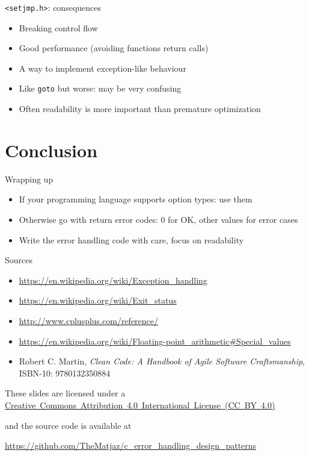 \documentclass[aspectratio=169,14pt]{beamer}
\begin{document}
\begin{frame}{\texttt{<setjmp.h>}: consequences}
\begin{itemize}
    \item[\good] Breaking control flow
    \item[\good] Good performance (avoiding functions return calls)
    \item[\good] A way to implement exception-like behaviour
    \item[\bad] Like \texttt{goto} but worse: may be very confusing
    \item[\bad] Often readability is more important than premature optimization
\end{itemize}
\end{frame}





\section{Conclusion}

\begin{frame}{Wrapping up}
\begin{itemize}
    \item If your programming language supports option types: use them
    \item Otherwise go with return error codes: 0 for OK, other values for error cases
    \item Write the error handling code with care, focus on readability
\end{itemize}
\end{frame}



\begin{frame}{Sources}
\begin{small}
    \begin{itemize}
        \item \url{https://en.wikipedia.org/wiki/Exception_handling}
        \item \url{https://en.wikipedia.org/wiki/Exit_status}
        \item \url{http://www.cplusplus.com/reference/}
        \item \url{https://en.wikipedia.org/wiki/Floating-point_arithmetic\#Special_values}
        \item Robert C. Martin, \textit{Clean Code: A Handbook of Agile Software Craftsmanship}, ISBN-10: 9780132350884 
    \end{itemize}
\end{small}
    
\begin{footnotesize}
    \begin{center}
        These slides are licensed under a \href{https://creativecommons.org/licenses/by/4.0/}{Creative~Commons~Attribution~4.0~International~License~(CC~BY~4.0)}
        
        and the source code is available at
        
        \url{https://github.com/TheMatjaz/c_error_handling_design_patterns}
    \end{center}    
\end{footnotesize}
\end{frame}
\end{document}
